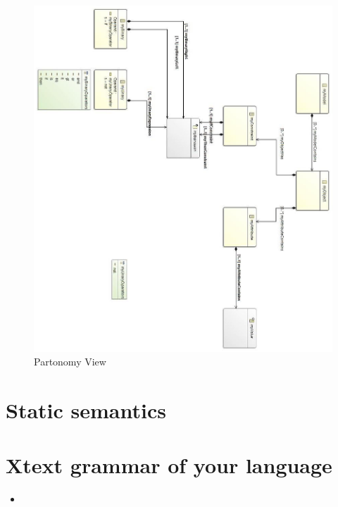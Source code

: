 \documentclass[paper=a4, fontsize=11pt]{scrartcl} %
\numberwithin{equation}{section} %
\numberwithin{figure}{section} %
\numberwithin{table}{section} %
\newcommand{\java}[2]{
\begin{itemize}
\item[]
\end{itemize}
}
\begin{document}
\begin{figure}[H]
\centering
\includegraphics[scale=0.7]{pictures/partView.jpg}
\caption{Partonomy View}
\end{figure}


\section{Static semantics}



\section{Xtext grammar of your language}
\java{../configproject/xtext/org.xtext.example.smdpdsl/src/org/xtext/example/mydsl/SmdpDsl.xtext}{static}
\end{document}
